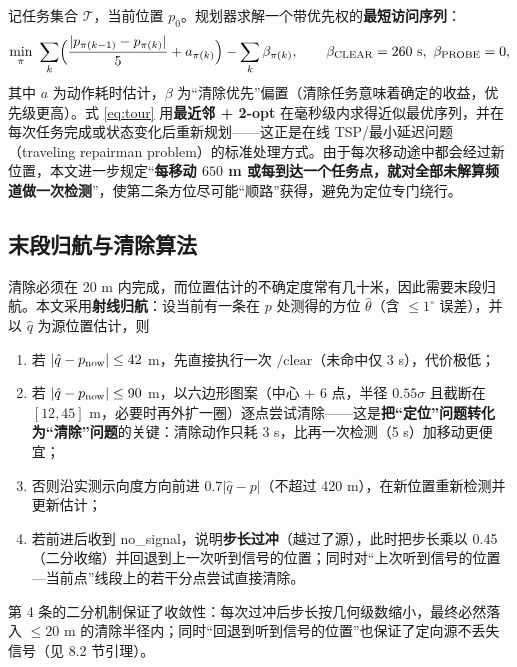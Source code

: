 \documentclass{cumcmthesis}
\begin{document}
记任务集合 $\mathcal T$，当前位置 $p_0$。规划器求解一个带优先权的\textbf{最短访问序列}：
\begin{equation}
\min_{\pi}\ \sum_{k}\Bigl(\frac{|p_{\pi(k-1)}-p_{\pi(k)}|}{5}+a_{\pi(k)}\Bigr)
-\sum_{k}\beta_{\pi(k)},
\qquad \beta_{\text{CLEAR}}=260\ \text{s},\ \beta_{\text{PROBE}}=0,
\label{eq:tour}
\end{equation}
其中 $a$ 为动作耗时估计，$\beta$ 为“清除优先”偏置（清除任务意味着确定的收益，优先级更高）。式 \eqref{eq:tour} 用\textbf{最近邻 + 2-opt} 在毫秒级内求得近似最优序列，并在每次任务完成或状态变化后重新规划——这正是在线 TSP/最小延迟问题（traveling repairman problem）的标准处理方式\cite{ausiello2001,afrati1986,blum1994,psaraftis1995}。由于每次移动途中都会经过新位置，本文进一步规定“\textbf{每移动 $650$ m 或每到达一个任务点，就对全部未解算频道做一次检测}”，使第二条方位尽可能“顺路”获得，避免为定位专门绕行。

\subsection{末段归航与清除算法}

清除必须在 20 m 内完成，而位置估计的不确定度常有几十米，因此需要末段归航。本文采用\textbf{射线归航}：设当前有一条在 $p$ 处测得的方位 $\hat\theta$（含 $\le1^{\circ}$ 误差），并以 $\hat q$ 为源位置估计，则

\begin{enumerate}
  \item 若 $|\hat q-p_{\rm now}|\le42$ m，先直接执行一次 $\text{/clear}$（未命中仅 3 s），代价极低；
  \item 若 $|\hat q-p_{\rm now}|\le90$ m，以六边形图案（中心 + 6 点，半径 $0.55\sigma$ 且截断在 $[12,45]$ m，必要时再外扩一圈）逐点尝试清除——这是\textbf{把“定位”问题转化为“清除”问题}的关键：清除动作只耗 3 s，比再一次检测（5 s）加移动更便宜；
  \item 否则沿实测示向度方向前进 $0.7|\hat q-p|$（不超过 420 m），在新位置重新检测并更新估计；
  \item 若前进后收到 no\_signal，说明\textbf{步长过冲}（越过了源），此时把步长乘以 0.45（二分收缩）并回退到上一次听到信号的位置；同时对“上次听到信号的位置—当前点”线段上的若干分点尝试直接清除。
\end{enumerate}

第 4 条的二分机制保证了收敛性：每次过冲后步长按几何级数缩小，最终必然落入 $\le20$ m 的清除半径内；同时“回退到听到信号的位置”也保证了定向源不丢失信号（见 8.2 节引理）。
\end{document}
